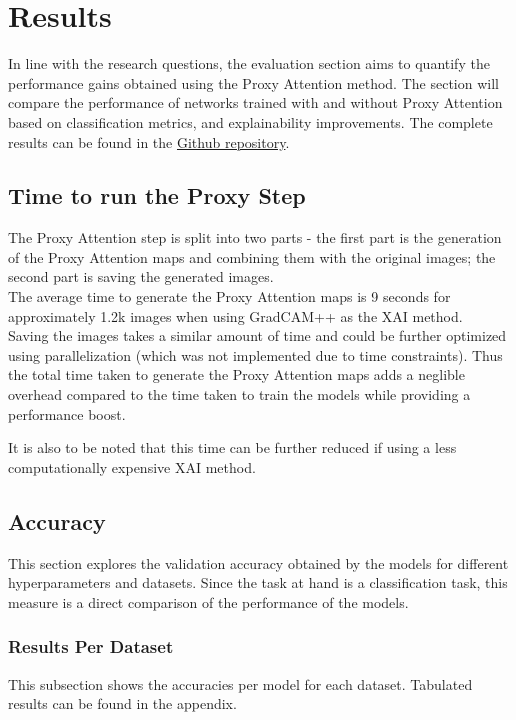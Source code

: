 \documentclass[a4paper,11pt,openright]{book}
\begin{document}
\chapter{Results} \label{ch:results}

In line with the research questions, the evaluation section aims to quantify the performance gains obtained using the Proxy Attention method. The section will compare the performance of networks trained with and without Proxy Attention based on classification metrics, and explainability improvements.
The complete results can be found in the \href{https://github.com/SubhadityaMukherjee/proxy_attention/blob/main/src/results/aggregated_runs.csv}{Github repository}.

\section{Time to run the Proxy Step}
The Proxy Attention step is split into two parts - the first part is the generation of the Proxy Attention maps and combining them with the original images; the second part is saving the generated images.\\ 
The average time to generate the Proxy Attention maps is 9 seconds for approximately 1.2k images when using GradCAM++ \cite{chattopadhyayGradCAMImprovedVisual2018} as the XAI method. \\
Saving the images takes a similar amount of time and could be further optimized using parallelization (which was not implemented due to time constraints). Thus the total time taken to generate the Proxy Attention maps adds a neglible overhead compared to the time taken to train the models while providing a performance boost. 

It is also to be noted that this time can be further reduced if using a less computationally expensive XAI method.

\section{Accuracy}
This section explores the validation accuracy obtained by the models for different hyperparameters and datasets. Since the task at hand is a classification task, this measure is a direct comparison of the performance of the models.

\subsection{Results Per Dataset}
This subsection shows the accuracies per model for each dataset. Tabulated results can be found in the appendix.
\end{document}

